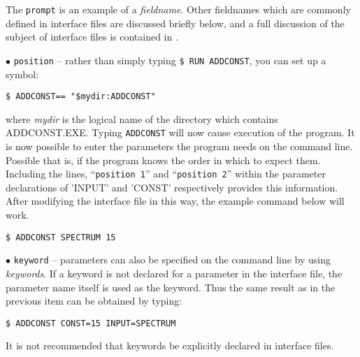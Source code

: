 The {\tt prompt} is an example of a {\sl fieldname}.
Other fieldnames which are commonly defined in interface files are 
discussed briefly below, 
and a full discussion of 
the subject of interface files is contained in .
\begin{description}
\item{$\bullet$ \tt position} -- 
rather than simply typing {\tt \$ RUN ADDCONST}, you can set up a symbol:
\begin{verbatim}
$ ADDCONST== "$mydir:ADDCONST"
\end{verbatim}
where {\sl mydir\/} is the logical name of the directory which contains 
ADDCONST.EXE.
Typing {\tt ADDCONST} will now cause execution of the program.
It is now possible to enter the parameters the program needs on the 
command line.
Possible that is, if the program knows the order in which to expect them.
Including the lines, ``{\tt position 1}'' and ``{\tt position 2}'' within the
parameter declarations of 'INPUT' and 'CONST' respectively  provides this 
information. 
After 	modifying the interface file in this way, the example command 
below will work.
\begin{verbatim}
$ ADDCONST SPECTRUM 15
\end{verbatim}

\item{$\bullet$ \tt keyword} -- parameters can also be specified on 
the command line by using {\sl keywords}.
If a keyword is not declared for a parameter in the interface file,
the parameter name itself is used as the keyword.
Thus the same result as in the previous item can be obtained by typing:
\begin{verbatim}
$ ADDCONST CONST=15 INPUT=SPECTRUM
\end{verbatim}
It is not recommended that keywords be explicitly declared in interface 
files.


\end{description}

